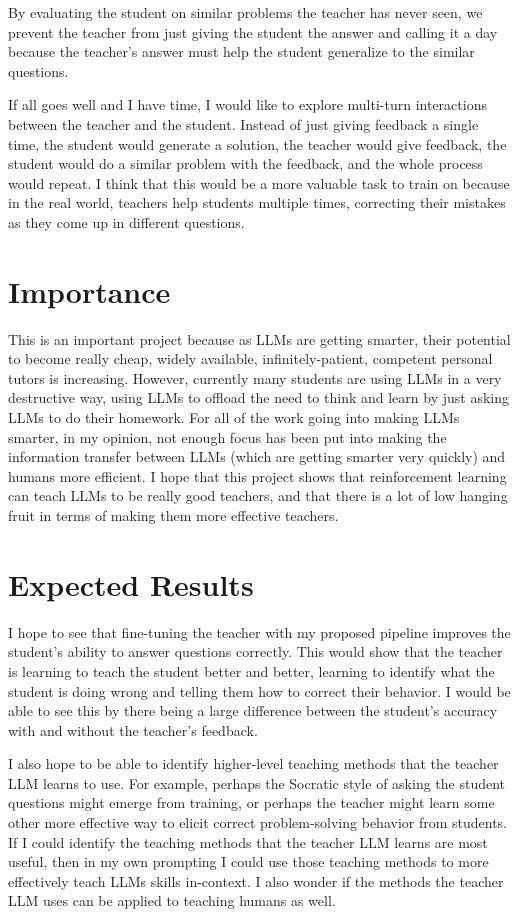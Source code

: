 \documentclass{article}
\begin{document}
By evaluating the student on similar problems the teacher has never seen, we prevent the teacher from just
giving the student the answer and calling it a day because the teacher's answer must help the student
generalize to the similar questions.

If all goes well and I have time, I would like to explore multi-turn interactions between
the teacher and the student. Instead of just giving feedback a single time, the student would generate
a solution, the teacher would give feedback, the student would do a similar problem with the feedback,
and the whole process would repeat. I think that this would be a more valuable task to train on because
in the real world, teachers help students multiple times, correcting their mistakes as they come up in
different questions.

\section{Importance}
This is an important project because as LLMs are getting smarter, their potential to become
really cheap, widely available, infinitely-patient, competent personal tutors is increasing.
However, currently many students are using LLMs in a very destructive way, using LLMs to offload
the need to think and learn by just asking LLMs to do their homework. For all of the
work going into making LLMs smarter, in my opinion, not enough focus has been put into making the information
transfer between LLMs (which are getting smarter very quickly) and humans more efficient. I hope that this project
shows that reinforcement learning can teach LLMs to be really good teachers, and that there is a lot of
low hanging fruit in terms of making them more effective teachers.

\section{Expected Results}
I hope to see that fine-tuning the teacher with my proposed pipeline improves the student's ability
to answer questions correctly. This would show that the teacher is learning to teach the student better
and better, learning to identify what the student is doing wrong and telling them how to correct their behavior.
I would be able to see this by there being a large difference between the student's accuracy with and without
the teacher's feedback.

I also hope to be able to identify higher-level teaching methods that the teacher LLM learns to use.
For example, perhaps the Socratic style of asking the student questions might emerge from training,
or perhaps the teacher might learn some other more effective way to elicit correct problem-solving behavior
from students. If I could identify the teaching methods that the teacher LLM learns are most useful,
then in my own prompting I could use those teaching methods to more effectively teach LLMs skills in-context.
I also wonder if the methods the teacher LLM uses can be applied to teaching humans as well.
\end{document}
